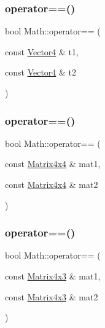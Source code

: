 \mbox{\label{namespace_math_a63e6345cc66935721e93c8c65978eb7e}} 
\subsubsection{\texorpdfstring{operator==()}{operator==()}\hspace{0.1cm}{\footnotesize\ttfamily [3/6]}}
{\footnotesize\ttfamily bool Math\+::operator== (\begin{DoxyParamCaption}\item[{const \mbox{\hyperlink{struct_math_1_1_vector4}{Vector4}} \&}]{t1,  }\item[{const \mbox{\hyperlink{struct_math_1_1_vector4}{Vector4}} \&}]{t2 }\end{DoxyParamCaption})}

\mbox{\label{namespace_math_a5b40764391fa4cbbc642c330f4299874}} 
\subsubsection{\texorpdfstring{operator==()}{operator==()}\hspace{0.1cm}{\footnotesize\ttfamily [4/6]}}
{\footnotesize\ttfamily bool Math\+::operator== (\begin{DoxyParamCaption}\item[{const \mbox{\hyperlink{struct_math_1_1_matrix4x4}{Matrix4x4}} \&}]{mat1,  }\item[{const \mbox{\hyperlink{struct_math_1_1_matrix4x4}{Matrix4x4}} \&}]{mat2 }\end{DoxyParamCaption})}

\mbox{\label{namespace_math_abf6196400c58b30a5a616aefccff2f14}} 
\subsubsection{\texorpdfstring{operator==()}{operator==()}\hspace{0.1cm}{\footnotesize\ttfamily [5/6]}}
{\footnotesize\ttfamily bool Math\+::operator== (\begin{DoxyParamCaption}\item[{const \mbox{\hyperlink{struct_math_1_1_matrix4x3}{Matrix4x3}} \&}]{mat1,  }\item[{const \mbox{\hyperlink{struct_math_1_1_matrix4x3}{Matrix4x3}} \&}]{mat2 }\end{DoxyParamCaption})}

